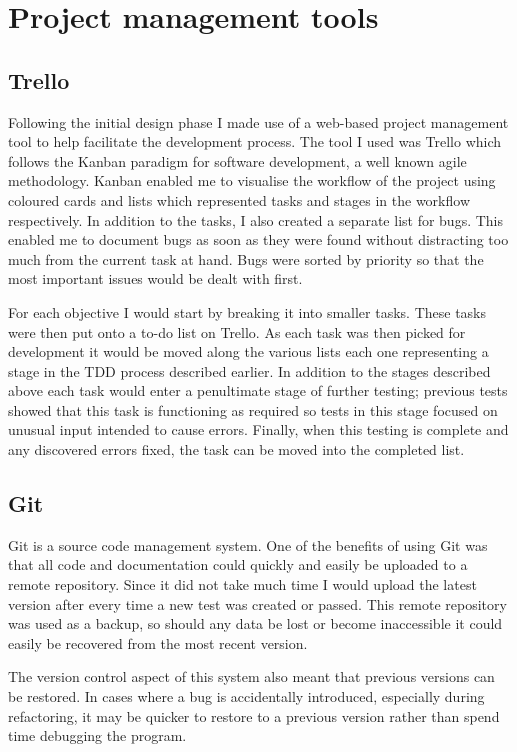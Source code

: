 \section{Project management tools}

\subsection{Trello}

Following the initial design phase I made use of a web-based project management tool to help facilitate the development process. The tool I used was Trello which follows the Kanban paradigm for software development, a well known agile methodology. Kanban enabled me to visualise the workflow of the project using coloured cards and lists which represented tasks and stages in the workflow respectively. In addition to the tasks, I also created a separate list for bugs. This enabled me to document bugs as soon as they were found without distracting too much from the current task at hand. Bugs were sorted by priority so that the most important issues would be dealt with first.

For each objective I would start by breaking it into smaller tasks. These tasks were then put onto a to-do list on Trello. As each task was then picked for development it would be moved along the  various lists each one representing a stage in the TDD process described earlier.  In addition to the stages described above each task would enter a penultimate stage of further testing; previous tests showed that this task is functioning as required so tests in this stage focused on unusual input intended to cause errors. Finally, when this testing is complete and any discovered errors fixed, the task can be moved into the completed list.

\subsection{Git}

Git is a source code management system. One of the benefits of using Git was that all code and documentation could quickly and easily be uploaded to a remote repository. Since it did not take much time I would upload the latest version after every time a new test was created or passed. This remote repository was used as a backup, so should any data be lost or become inaccessible it could easily be recovered from the most recent version.

The version control aspect of this system also meant that previous versions can be restored. In cases  where a bug is accidentally introduced, especially during refactoring, it may be quicker to restore to a previous version rather than spend time debugging the program.
